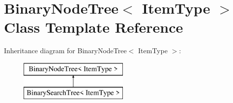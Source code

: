 \hypertarget{class_binary_node_tree}{}\section{Binary\+Node\+Tree$<$ Item\+Type $>$ Class Template Reference}
\label{class_binary_node_tree}
Inheritance diagram for Binary\+Node\+Tree$<$ Item\+Type $>$\+:\begin{figure}[H]
\begin{center}
\leavevmode
\includegraphics[height=2.000000cm]{class_binary_node_tree}
\end{center}
\end{figure}

